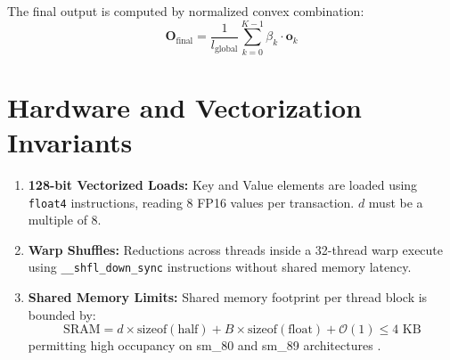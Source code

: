 \documentclass[11pt,a4paper]{article}
\begin{document}
The final output is computed by normalized convex combination:
\begin{equation}
\mathbf{O}_{\text{final}} = \frac{1}{l_{\text{global}}} \sum_{k=0}^{K-1} \beta_k \cdot \mathbf{o}_k
\end{equation}

\section{Hardware and Vectorization Invariants}

\begin{enumerate}
    \item \textbf{128-bit Vectorized Loads:} Key and Value elements are loaded using \texttt{float4} instructions, reading 8 FP16 values per transaction. $d$ must be a multiple of 8.
    \item \textbf{Warp Shuffles:} Reductions across threads inside a 32-thread warp execute using \texttt{\_\_shfl\_down\_sync} instructions without shared memory latency.
    \item \textbf{Shared Memory Limits:} Shared memory footprint per thread block is bounded by:
    \begin{equation}
    \text{SRAM} = d \times \text{sizeof}(\text{half}) + B \times \text{sizeof}(\text{float}) + \mathcal{O}(1) \le 4\text{ KB}
    \end{equation}
    permitting high occupancy on sm\_80 and sm\_89 architectures \cite{nvidia2024cuda}.
\end{enumerate}
\end{document}
